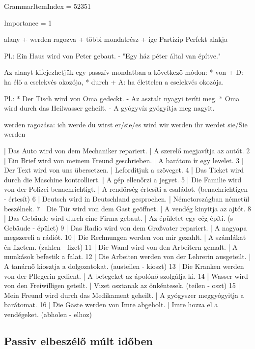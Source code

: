 \documentclass{article}
\newenvironment{desc}{\verbatim}{\endverbatim}
\newenvironment{exmp}{\verbatim}{\endverbatim}
\begin{document}
GrammarItemIndex = 52351

Importance = 1

\begin{desc}
alany + werden ragozva + többi mondatrész + ige Partizip Perfekt alakja

Pl.: Ein Haus wird von Peter gebaut. - "Egy ház péter által van építve."

Az alanyt kifejezhetjük egy passzív mondatban a következő módon:
* von + D: ha élő a cselekvés okozója,
* durch + A: ha élettelen a cselekvés okozója.

Pl.: * Der Tisch wird von Oma gedeckt. - Az asztalt nyagyi teríti meg.
* Oma wird durch das Heilwasser geheilt. - A gyógyvíz gyógyítja meg nagyit.

werden ragozása:
ich werde
du wirst
er/sie/es wird
wir werden
ihr werdet
sie/Sie werden
\end{desc}

\begin{exmp}
1 | Das Auto wird von dem Mechaniker repariert. | A szerelő megjavítja az autót.
2 | Ein Brief wird von meinem Freund geschrieben. | A barátom ír egy levelet.
3 | Der Text wird von uns übersetzen. | Lefordítjuk a szöveget.
4 | Das Ticket wird durch die Maschine kontrolliert. | A gép ellenőrzi a jegyet.
5 | Die Familie wird von der Polizei benachrichtigt. | A rendőrség értesíti a családot. (benachrichtigen - értesít)
6 | Deutsch wird in Deutschland gesprochen. | Németországban németül beszélnek.
7 | Die Tür wird von dem Gast geöffnet. | A vendég kinyitja az ajtót.
8 | Das Gebäude wird durch eine Firma gebaut. | Az épületet egy cég építi. (s Gebäude - épület)
9 | Das Radio wird von dem Großvater repariert. | A nagyapa megszereli a rádiót.
10 | Die Rechnungen werden von mir gezahlt. | A számlákat én fizetem. (zahlen - fizet)
11 | Die Wand wird von den Arbeitern gemalt. | A munkások befestik a falat.
12 | Die Arbeiten werden von der Lehrerin ausgeteilt. | A tanárnő kiosztja a dolgozatokat. (austeilen - kioszt)
13 | Die Kranken werden von der Pflegerin gedient. | A betegeket az ápolónő szolgálja ki.
14 | Wasser wird von den Freiwilligen geteilt. | Vizet osztanak az önkéntesek. (teilen - oszt)
15 | Mein Freund wird durch das Medikament geheilt. | A gyógyszer meggyógyitja a barátomat.
16 | Die Gäste werden von Imre abgeholt. | Imre hozza el a vendégeket. (abholen - elhoz)
\end{exmp}

\subsection{Passiv elbeszélő múlt időben}
\end{document}
